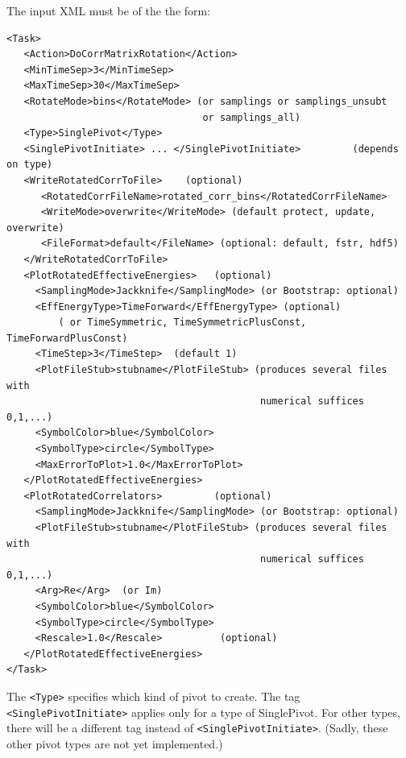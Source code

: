 \documentclass[12pt]{article}
\newcommand{\vb}{\texttt}
\begin{document}
The input XML must be of the the form:
\begin{verbatim}
<Task>
   <Action>DoCorrMatrixRotation</Action>
   <MinTimeSep>3</MinTimeSep>
   <MaxTimeSep>30</MaxTimeSep>
   <RotateMode>bins</RotateMode> (or samplings or samplings_unsubt 
                                  or samplings_all)
   <Type>SinglePivot</Type>
   <SinglePivotInitiate> ... </SinglePivotInitiate>         (depends on type)
   <WriteRotatedCorrToFile>    (optional)
      <RotatedCorrFileName>rotated_corr_bins</RotatedCorrFileName>
      <WriteMode>overwrite</WriteMode> (default protect, update, overwrite)
      <FileFormat>default</FileName> (optional: default, fstr, hdf5)
   </WriteRotatedCorrToFile>
   <PlotRotatedEffectiveEnergies>   (optional)
     <SamplingMode>Jackknife</SamplingMode> (or Bootstrap: optional)
     <EffEnergyType>TimeForward</EffEnergyType> (optional)
         ( or TimeSymmetric, TimeSymmetricPlusConst, TimeForwardPlusConst)
     <TimeStep>3</TimeStep>  (default 1)
     <PlotFileStub>stubname</PlotFileStub> (produces several files with
                                            numerical suffices 0,1,...)
     <SymbolColor>blue</SymbolColor>
     <SymbolType>circle</SymbolType>
     <MaxErrorToPlot>1.0</MaxErrorToPlot>
   </PlotRotatedEffectiveEnergies>
   <PlotRotatedCorrelators>         (optional)
     <SamplingMode>Jackknife</SamplingMode> (or Bootstrap: optional)
     <PlotFileStub>stubname</PlotFileStub> (produces several files with
                                            numerical suffices 0,1,...)
     <Arg>Re</Arg>  (or Im)
     <SymbolColor>blue</SymbolColor>
     <SymbolType>circle</SymbolType>
     <Rescale>1.0</Rescale>          (optional)
   </PlotRotatedEffectiveEnergies>
</Task>
\end{verbatim}
The \vb{<Type>} specifies which kind of pivot to create.  The tag                  
\vb{<SinglePivotInitiate>} applies only for a type of SinglePivot.  For            
other types, there will be a different tag instead of \vb{<SinglePivotInitiate>}.  
(Sadly, these other pivot types are not yet implemented.)
\end{document}
